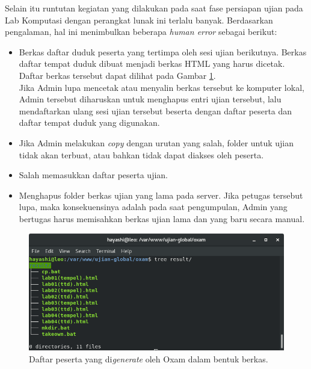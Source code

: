 Selain itu runtutan kegiatan yang dilakukan pada saat fase persiapan ujian pada
Lab Komputasi dengan perangkat lunak ini terlalu banyak. Berdasarkan pengalaman,
hal ini menimbulkan beberapa \textit{human error} sebagai berikut:
    \begin{itemize}
        \item Berkas daftar duduk peserta yang tertimpa oleh sesi ujian
            berikutnya. Berkas daftar tempat duduk dibuat menjadi berkas HTML
            yang harus dicetak. Daftar berkas tersebut dapat dilihat pada Gambar
            \ref{fig:ss-folder-gen}.\\
            Jika Admin lupa mencetak atau menyalin berkas tersebut ke komputer
            lokal, Admin tersebut diharuskan untuk menghapus entri ujian
            tersebut, lalu mendaftarkan ulang sesi ujian tersebut beserta dengan
            daftar peserta dan daftar tempat duduk yang digunakan.

        \item Jika Admin melakukan \textit{copy} dengan urutan yang salah, folder untuk
            ujian tidak akan terbuat, atau bahkan tidak dapat diakses oleh peserta.
        
        \item Salah memasukkan daftar peserta ujian.
        
        \item Menghapus folder berkas ujian yang lama pada server. Jika petugas
            tersebut lupa, maka konsekuensinya adalah pada saat pengumpulan,
            Admin yang bertugas harus memisahkan berkas ujian lama dan yang baru
            secara manual.
    \end{itemize}

\begin{figure}
    \centering
    \includegraphics[width=0.7\paperwidth]{Gambar/ss-struktur-folder-generator.png}
    \caption{Daftar peserta yang di\textit{generate} oleh Oxam dalam bentuk
    berkas.}
    \label{fig:ss-folder-gen}
\end{figure}

